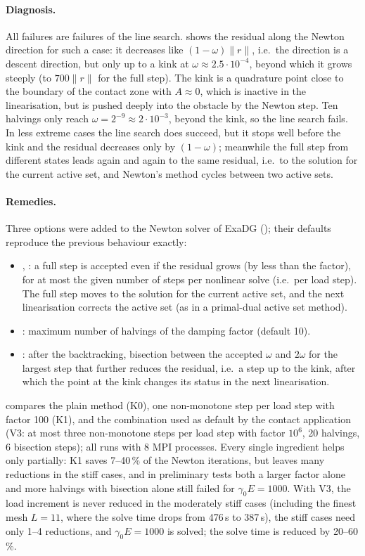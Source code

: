 \documentclass[11pt,a4paper]{article}
\begin{document}
\paragraph{Diagnosis.}
All failures are failures of the line search.  shows the residual along the Newton
direction for such a case: it decreases like $(1-\omega)\|r\|$, i.e.\ the direction is a descent
direction, but only up to a kink at $\omega\approx2.5\cdot10^{-4}$, beyond which it grows steeply
(to $700\|r\|$ for the full step). The kink is a quadrature point close to the boundary of the
contact zone with $A\approx0$, which is inactive in the linearisation, but is pushed deeply into the
obstacle by the Newton step. Ten halvings only reach $\omega=2^{-9}\approx2\cdot10^{-3}$, beyond the
kink, so the line search fails. In less extreme cases the line search does succeed, but it stops
well before the kink and the residual decreases only by $(1-\omega)$; meanwhile the full step from
different states leads again and again to the same residual, i.e.\ to the solution for the current
active set, and Newton's method cycles between two active sets.

\paragraph{Remedies.}
Three options were added to the Newton solver of ExaDG (); their defaults
reproduce the previous behaviour exactly:
\begin{itemize}
  \item {}, : a full step is accepted even if the
    residual grows (by less than the factor), for at most the given number of steps per nonlinear
    solve (i.e.\ per load step).
    The full step moves to the solution for the current active set, and the next linearisation
    corrects the active set (as in a primal-dual active set method).
  \item {}: maximum number of halvings of the damping factor (default 10).
  \item {}: after the backtracking, bisection between the accepted
    $\omega$ and $2\omega$ for the largest step that further reduces the residual, i.e.\ a step up
    to the kink, after which the point at the kink changes its status in the next linearisation.
\end{itemize}
 compares the plain method (K0), one non-monotone step per load step with factor
100 (K1), and the combination used as default by the contact application (V3: at most three
non-monotone steps per load step with factor $10^6$, 20 halvings, 6 bisection steps); all runs
with 8 MPI processes. Every single ingredient helps only partially: K1 saves 7--40\,\% of the
Newton iterations, but leaves many reductions in the stiff cases, and in preliminary tests both a
larger factor alone and more halvings with bisection alone still failed for $\gamma_0E=1000$. With
V3, the load increment is never reduced in the moderately stiff cases (including the finest mesh
$L=11$, where the solve time drops from 476\,s to 387\,s), the stiff cases need only 1--4
reductions, and $\gamma_0E=1000$ is solved; the solve time is reduced by 20--60\,\%.
\end{document}
